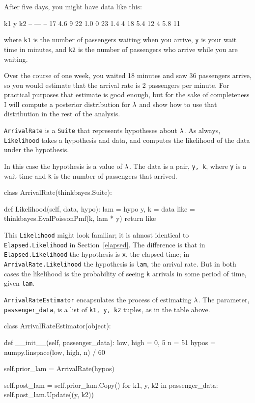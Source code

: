 \documentclass[12pt]{book}
\theoremstyle{exercise}
\newcommand{\py}[1]{{\tt #1}}%
\begin{document}
After five days, you might have data like this:
%
\begin{code}
k1      y     k2
--     ---    --
17     4.6     9
22     1.0     0
23     1.4     4
18     5.4    12
4      5.8    11
\end{code}
%
where \py{k1} is the number of passengers waiting when you arrive,
\py{y} is your wait time in minutes, and \py{k2} is the number of
passengers who arrive while you are waiting.

Over the course of one week, you waited 18 minutes and saw 36
passengers arrive, so you would estimate that the arrival rate is
2 passengers per minute.  For practical purposes that estimate is
good enough, but for the sake of completeness I
will compute a posterior distribution for $\mathtt{\lambda}$ and show how
to use that distribution in the rest of the analysis.

\py{ArrivalRate} is a \py{Suite} that represents hypotheses about
$\mathtt{\lambda}$.  As always, \py{Likelihood} takes a hypothesis and data,
and computes the likelihood of the data under the hypothesis.

In this case the hypothesis is a value of $\mathtt{\lambda}$.  The data is a
pair, \py{y, k}, where \py{y} is a wait time and \py{k} is the
number of passengers that arrived.

\begin{code}
class ArrivalRate(thinkbayes.Suite):

    def Likelihood(self, data, hypo):
        lam = hypo
        y, k = data
        like = thinkbayes.EvalPoissonPmf(k, lam * y)
        return like
\end{code}

This \py{Likelihood} might look familiar; it
is almost identical to \py{Elapsed.Likelihood} in
Section~\ref{elapsed}.  The difference is that in {\tt
  Elapsed.Likelihood} the hypothesis is \py{x}, the elapsed time; in
\py{ArrivalRate.Likelihood} the hypothesis is \py{lam}, the arrival
rate.  But in both cases the likelihood is the probability of seeing
\py{k} arrivals in some period of time, given \py{lam}.

\py{ArrivalRateEstimator} encapsulates the process of estimating
$\mathtt{\lambda}$.  The parameter, \verb"passenger_data", is a list
of \py{k1, y, k2} tuples, as in the table above.

\begin{code}
class ArrivalRateEstimator(object):

    def __init__(self, passenger_data):
        low, high = 0, 5
        n = 51
        hypos = numpy.linspace(low, high, n) / 60

        self.prior_lam = ArrivalRate(hypos)

        self.post_lam = self.prior_lam.Copy()
        for k1, y, k2 in passenger_data:
            self.post_lam.Update((y, k2))
\end{code}
\end{document}
